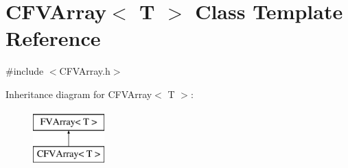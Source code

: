 \hypertarget{classFVL_1_1CFVArray}{
\section{CFVArray$<$ T $>$ Class Template Reference}
\label{dc/d80/classFVL_1_1CFVArray}
}


{\ttfamily \#include $<$CFVArray.h$>$}

Inheritance diagram for CFVArray$<$ T $>$:\begin{figure}[H]
\begin{center}
\leavevmode
\includegraphics[height=2.000000cm]{dc/d80/classFVL_1_1CFVArray}
\end{center}
\end{figure}
